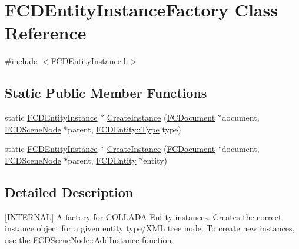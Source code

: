\hypertarget{classFCDEntityInstanceFactory}{
\section{FCDEntityInstanceFactory Class Reference}
\label{classFCDEntityInstanceFactory}
}


{\ttfamily \#include $<$FCDEntityInstance.h$>$}

\subsection*{Static Public Member Functions}
\begin{DoxyCompactItemize}
\item 
static \hyperlink{classFCDEntityInstance}{FCDEntityInstance} $\ast$ \hyperlink{classFCDEntityInstanceFactory_a1086af84220cd2d77a2c63c8f59a7b1a}{CreateInstance} (\hyperlink{classFCDocument}{FCDocument} $\ast$document, \hyperlink{classFCDSceneNode}{FCDSceneNode} $\ast$parent, \hyperlink{classFCDEntity_a9301a4bd5f4d4190ec13e40db4effdd7}{FCDEntity::Type} type)
\item 
static \hyperlink{classFCDEntityInstance}{FCDEntityInstance} $\ast$ \hyperlink{classFCDEntityInstanceFactory_af3cad5e62eb5b634ec9bfeb096ca06e3}{CreateInstance} (\hyperlink{classFCDocument}{FCDocument} $\ast$document, \hyperlink{classFCDSceneNode}{FCDSceneNode} $\ast$parent, \hyperlink{classFCDEntity}{FCDEntity} $\ast$entity)
\end{DoxyCompactItemize}


\subsection{Detailed Description}
\mbox{[}INTERNAL\mbox{]} A factory for COLLADA Entity instances. Creates the correct instance object for a given entity type/XML tree node. To create new instances, use the \hyperlink{classFCDSceneNode_a38826dd9b894ad2371511f0228cb04c0}{FCDSceneNode::AddInstance} function. 

